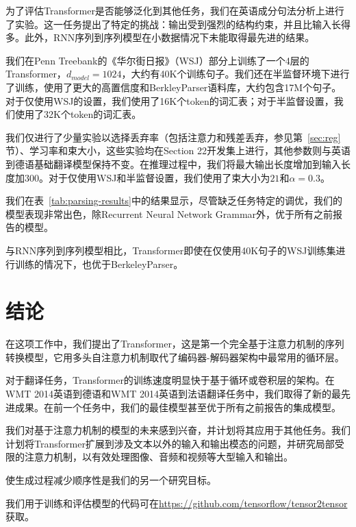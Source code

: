 \documentclass[lang=cn,a4paper,newtx]{elegantpaper}
\begin{document}
为了评估Transformer是否能够泛化到其他任务，我们在英语成分句法分析上进行了实验。这一任务提出了特定的挑战：输出受到强烈的结构约束，并且比输入长得多。此外，RNN序列到序列模型在小数据情况下未能取得最先进的结果。

我们在Penn Treebank的《华尔街日报》（WSJ）部分上训练了一个4层的Transformer，$d_{model} = 1024$，大约有40K个训练句子。我们还在半监督环境下进行了训练，使用了更大的高置信度和BerkleyParser语料库，大约包含17M个句子。对于仅使用WSJ的设置，我们使用了16K个token的词汇表；对于半监督设置，我们使用了32K个token的词汇表。

我们仅进行了少量实验以选择丢弃率（包括注意力和残差丢弃，参见第~\ref{sec:reg}节）、学习率和束大小，这些实验均在Section 22开发集上进行，其他参数则与英语到德语基础翻译模型保持不变。在推理过程中，我们将最大输出长度增加到输入长度加$300$。对于仅使用WSJ和半监督设置，我们使用了束大小为$21$和$\alpha=0.3$。

我们在表~\ref{tab:parsing-results}中的结果显示，尽管缺乏任务特定的调优，我们的模型表现非常出色，除Recurrent Neural Network Grammar外，优于所有之前报告的模型。

与RNN序列到序列模型相比，Transformer即使在仅使用40K句子的WSJ训练集进行训练的情况下，也优于BerkeleyParser。

\section{结论}

在这项工作中，我们提出了Transformer，这是第一个完全基于注意力机制的序列转换模型，它用多头自注意力机制取代了编码器-解码器架构中最常用的循环层。

对于翻译任务，Transformer的训练速度明显快于基于循环或卷积层的架构。在WMT 2014英语到德语和WMT 2014英语到法语翻译任务中，我们取得了新的最先进成果。在前一个任务中，我们的最佳模型甚至优于所有之前报告的集成模型。

我们对基于注意力机制的模型的未来感到兴奋，并计划将其应用于其他任务。我们计划将Transformer扩展到涉及文本以外的输入和输出模态的问题，并研究局部受限的注意力机制，以有效处理图像、音频和视频等大型输入和输出。

使生成过程减少顺序性是我们的另一个研究目标。

我们用于训练和评估模型的代码可在\url{https://github.com/tensorflow/tensor2tensor}获取。

\pagebreak
\end{document}
